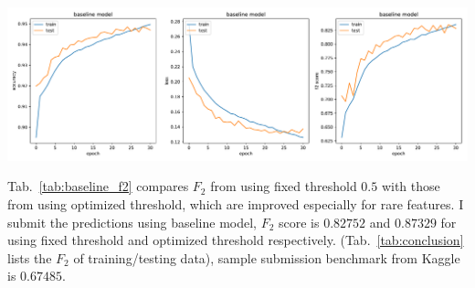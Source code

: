 \documentclass[11pt,oneside,a4paper]{article}
\newenvironment{Figure}
{\par\medskip\noindent\minipage{\linewidth}}
{\endminipage\par\medskip}
\begin{document}
\begin{Figure}
 \centering
 \includegraphics[width=1.\linewidth, height=0.33\linewidth]{baseline_metrics.pdf}
 \label{fig:baseline_metrics}
\end{Figure}

Tab.~\ref{tab:baseline_f2} compares $F_2$ from using fixed threshold $0.5$ with those from using optimized threshold, which are improved especially for rare features. I submit the predictions using baseline model, $F_2$ score is $0.82752$ and $0.87329$ for using fixed threshold and optimized threshold respectively. (Tab.~\ref{tab:conclusion} lists the $F_2$ of training/testing data), sample submission benchmark from Kaggle is $0.67485$. 
\end{document}
